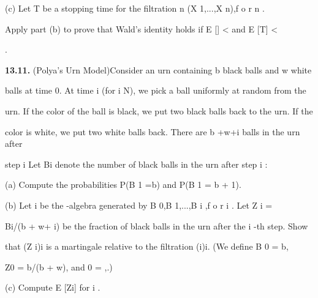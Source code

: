 (c) Let T be a stopping time for the filtration n \coloneqq\sigma(X 1,...,X n),f o r n .

Apply part (b) to prove that Wald's identity holds if E [\vert] < \infty and E [T] <

\infty .

\textbf{13.11.} (Polya's Urn Model)Consider an urn containing b black balls and w white

balls at time 0. At time i (for i \in N), we pick a ball uniformly at random from the

urn. If the color of the ball is black, we put two black balls back to the urn. If the

color is white, we put two white balls back. There are b +w+i balls in the urn after

step i Let Bi denote the number of black balls in the urn after step i :

(a) Compute the probabilities P(B 1 =b) and P(B 1 = b + 1).

(b) Let i be the \sigma -algebra generated by B 0,B 1,...,B i ,f o r i . Let Z i =

Bi/(b + w+ i) be the fraction of black balls in the urn after the i -th step. Show

that (Z i)i is a martingale relative to the filtration (i)i. (We define B 0 = b,

Z0 = b/(b + w), and 0 ={ \emptyset,\Omega}.)

(c) Compute E [Zi] for i .

